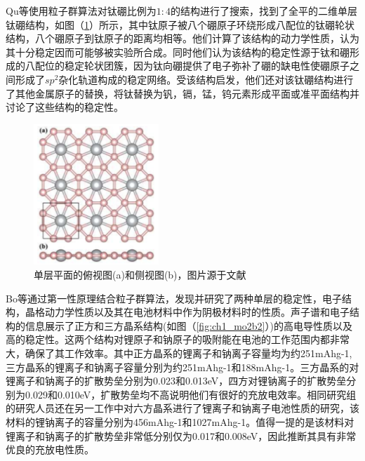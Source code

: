Qu等\cite{qu2017two}使用粒子群算法对钛硼比例为$1:4$的结构进行了搜索，找到了全平的二维单层钛硼结构，如图（\ref{fig:ch1_tib4}）所示，其中钛原子被八个硼原子环绕形成八配位的钛硼轮状结构，八个硼原子到钛原子的距离均相等。他们计算了该结构的动力学性质，认为其十分稳定因而可能够被实验所合成。同时他们认为该结构的稳定性源于钛和硼形成的八配位的稳定轮状团簇，因为钛向硼提供了电子弥补了硼的缺电性使硼原子之间形成了$sp^2$杂化轨道构成的稳定网络。受该结构启发，他们还对该钛硼结构进行了其他金属原子的替换，将钛替换为钒，镉，锰，钨元素形成平面或准平面结构并讨论了这些结构的稳定性。

\begin{figure}
  \includegraphics[width=0.42\textwidth]{figs/ch1_tib4.png}
  \centering
  \caption{单层平面的俯视图(a)和侧视图(b)，图片源于文献\cite{qu2017two}}
  \label{fig:ch1_tib4}
\end{figure}

Bo等\cite{bo2019tetragonal}通过第一性原理结合粒子群算法，发现并研究了两种单层的稳定性，电子结构，晶格动力学性质以及其在电池材料中作为阴极材料时的性质。声子谱和电子结构的信息展示了正方和三方晶系结构(如图（\ref{fig:ch1_mo2b2}）)的高电导性质以及高的稳定性。这两个结构对锂原子和钠原子的吸附能在电池的工作范围内都非常大，确保了其工作效率。其中正方晶系的锂离子和钠离子容量均为约251mAhg-1, 三方晶系的锂离子和钠离子容量分别为约251mAhg-1和188mAhg-1。三方晶系的对锂离子和钠离子的扩散势垒分别为0.023和0.013eV，四方对锂钠离子的扩散势垒分别为0.029和0.010eV，扩散势垒均不高说明他们有很好的充放电效率。相同研究组的研究人员还在另一工作中对六方晶系\cite{bo2018hexagonal}进行了锂离子和钠离子电池性质的研究，该材料的锂钠离子的容量分别为456mAhg-1和1027mAhg-1。值得一提的是该材料对锂离子和钠离子的扩散势垒非常低分别仅为0.017和0.008eV，因此推断其具有非常优良的充放电性质。

